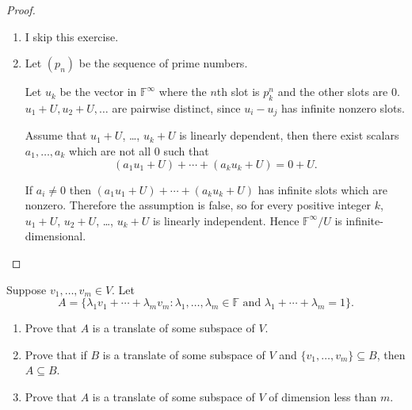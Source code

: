 \begin{proof}
    \begin{enumerate}[label={(\alph*)}]
        \item I skip this exercise.
        \item Let $(p_{n})$ be the sequence of prime numbers.

              Let $u_{k}$ be the vector in $\mathbb{F}^{\infty}$ where the $n$th slot is $p^{n}_{k}$ and the other slots are $0$. $u_{1} + U, u_{2} + U, \ldots$ are pairwise distinct, since $u_{i} - u_{j}$ has infinite nonzero slots.

              Assume that $u_{1} + U$, \ldots, $u_{k} + U$ is linearly dependent, then there exist scalars $a_{1}, \ldots, a_{k}$ which are not all $0$ such that
              \[
                  (a_{1}u_{1} + U) + \cdots + (a_{k}u_{k} + U) = 0 + U.
              \]

              If $a_{i}\ne 0$ then $(a_{1}u_{1} + U) + \cdots + (a_{k}u_{k} + U)$ has infinite slots which are nonzero. Therefore the assumption is false, so for every positive integer $k$, $u_{1} + U$, $u_{2} + U$, \ldots, $u_{k} + U$ is linearly independent. Hence $\mathbb{F}^{\infty}/U$ is infinite-dimensional.
    \end{enumerate}
\end{proof}
\newpage

\begin{exercise}
    Suppose $v_{1} , \ldots, v_{m} \in V$. Let
    \[
        A = \{ \lambda_{1}v_{1} + \cdots + \lambda_{m}v_{m}: \lambda_{1}, \ldots,\lambda_{m}\in\mathbb{F} \text{ and } \lambda_{1} + \cdots + \lambda_{m} = 1 \}.
    \]
    \begin{enumerate}[label={(\alph*)}]
        \item Prove that $A$ is a translate of some subspace of $V$.
        \item Prove that if $B$ is a translate of some subspace of $V$ and $\{ v_{1}, \ldots, v_{m} \} \subseteq B$, then $A\subseteq B$.
        \item Prove that $A$ is a translate of some subspace of $V$ of dimension less than $m$.
    \end{enumerate}
\end{exercise}

